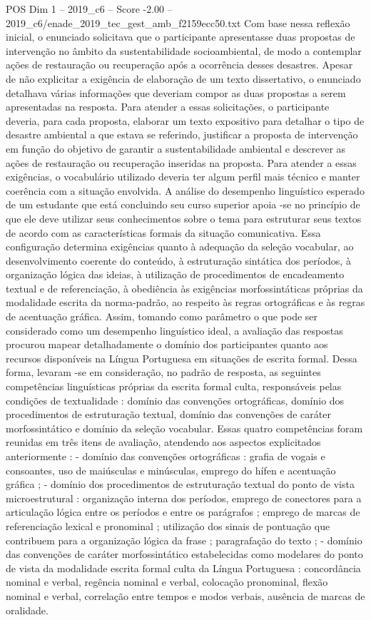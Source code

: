 \begin{textsample}{POS Dim 1 – 2019\_c6 – Score -2.00 – 2019\_c6/enade\_2019\_tec\_gest\_amb\_f2159ecc50.txt}
Com base nessa reflexão inicial, o enunciado solicitava que o participante apresentasse duas propostas de intervenção no âmbito da sustentabilidade socioambiental, de modo a contemplar ações de restauração ou recuperação após a ocorrência desses desastres.
Apesar de não explicitar a exigência de elaboração de um texto dissertativo, o enunciado detalhava várias informações que deveriam compor as duas propostas a serem apresentadas na resposta.
Para atender a essas solicitações, o participante deveria, para cada proposta, elaborar um texto expositivo para detalhar o tipo de desastre ambiental a que estava se referindo, justificar a proposta de intervenção em função do objetivo de garantir a sustentabilidade ambiental e descrever as ações de restauração ou recuperação inseridas na proposta.
Para atender a essas exigências, o vocabulário utilizado deveria ter algum perfil mais técnico e manter coerência com a situação envolvida.
A análise do desempenho linguístico esperado de um estudante que está concluindo seu curso superior apoia -se no princípio de que ele deve utilizar seus conhecimentos sobre o tema para estruturar seus textos de acordo com as características formais da situação comunicativa.
Essa configuração determina exigências quanto à adequação da seleção vocabular, ao desenvolvimento coerente do conteúdo, à estruturação sintática dos períodos, à organização lógica das ideias, à utilização de procedimentos de encadeamento textual e de referenciação, à obediência às exigências morfossintáticas próprias da modalidade escrita da norma-padrão, ao respeito às regras ortográficas e às regras de acentuação gráfica.
Assim, tomando como parâmetro o que pode ser considerado como um desempenho linguístico ideal, a avaliação das respostas procurou mapear detalhadamente o domínio dos participantes quanto aos recursos disponíveis na Língua Portuguesa em situações de escrita formal.
Dessa forma, levaram -se em consideração, no padrão de resposta, as seguintes competências linguísticas próprias da escrita formal culta, responsáveis pelas condições de textualidade : domínio das convenções ortográficas, domínio dos procedimentos de estruturação textual, domínio das convenções de caráter morfossintático e domínio da seleção vocabular.
Essas quatro competências foram reunidas em três itens de avaliação, atendendo aos aspectos explicitados anteriormente : - domínio das convenções ortográficas : grafia de vogais e consoantes, uso de maiúsculas e minúsculas, emprego do hífen e acentuação gráfica ; - domínio dos procedimentos de estruturação textual do ponto de vista microestrutural : organização interna dos períodos, emprego de conectores para a articulação lógica entre os períodos e entre os parágrafos ; emprego de marcas de referenciação lexical e pronominal ; utilização dos sinais de pontuação que contribuem para a organização lógica da frase ; paragrafação do texto ; - domínio das convenções de caráter morfossintático estabelecidas como modelares do ponto de vista da modalidade escrita formal culta da Língua Portuguesa : concordância nominal e verbal, regência nominal e verbal, colocação pronominal, flexão nominal e verbal, correlação entre tempos e modos verbais, ausência de marcas de oralidade.

\end{textsample}
